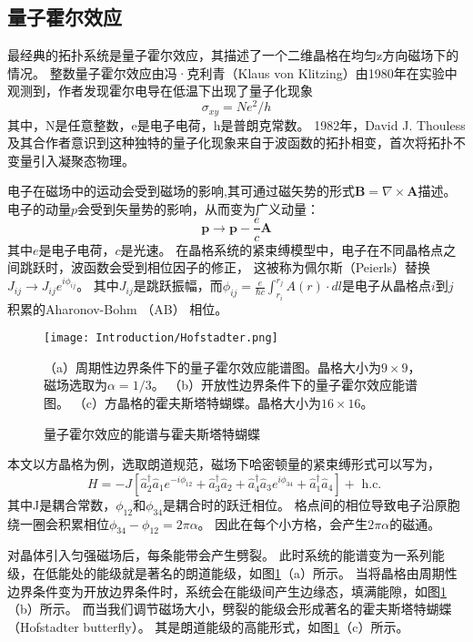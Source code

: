 \subsection{量子霍尔效应}
最经典的拓扑系统是量子霍尔效应，其描述了一个二维晶格在均匀z方向磁场下的情况。
整数量子霍尔效应由冯·克利青（Klaus von Klitzing）由1980年在实验中观测到\cite{klitzing1980new}，作者发现霍尔电导在低温下出现了量子化现象
\begin{equation}
	\sigma_{xy}=Ne^2/h
\end{equation}
其中，N是任意整数，e是电子电荷，h是普朗克常数。
1982年，David J. Thouless及其合作者意识到这种独特的量子化现象来自于波函数的拓扑相变\cite{thouless1982quantized}，首次将拓扑不变量引入凝聚态物理。

电子在磁场中的运动会受到磁场的影响,其可通过磁矢势的形式$\mathbf{B}=\nabla\times \mathbf{A}$描述。
电子的动量$p$会受到矢量势的影响，从而变为广义动量：
\begin{equation}
	\mathbf{p}\to \mathbf{p}-\frac{e}{c}\mathbf{A}
\end{equation}
其中$e$是电子电荷，$c$是光速。
在晶格系统的紧束缚模型中，电子在不同晶格点之间跳跃时，波函数会受到相位因子的修正，
这被称为佩尔斯（Peierls）替换$J_{ij}\to J_{ij}e^{i\phi_{ij}}$。
其中$J_{ij}$是跳跃振幅，而$\phi_{ij}=\frac{e}{\hbar c}\int_{r_i}^{r_j} A(r) \cdot dl$是电子从晶格点$i$到$j$积累的Aharonov-Bohm （AB） 相位。

\begin{figure}[htbp]
	\centering
	\texttt{[image: Introduction/Hofstadter.png]}
 \caption{量子霍尔效应的能谱与霍夫斯塔特蝴蝶}
（a）周期性边界条件下的量子霍尔效应能谱图。晶格大小为$9\times9$，磁场选取为$\alpha=1/3$。
（b）开放性边界条件下的量子霍尔效应能谱图。
（c）方晶格的霍夫斯塔特蝴蝶。晶格大小为$16\times16$。
 \label{fig:Hofstadter}
\end{figure}

本文以方晶格为例，选取朗道规范，磁场下哈密顿量的紧束缚形式可以写为，
\begin{equation}
	H=-J\left[\hat{a}_2^{\dagger} \hat{a}_1 e^{-i \phi_{12}}+\hat{a}_3^{\dagger} \hat{a}_2+\hat{a}_4^{\dagger} \hat{a}_3 e^{i \phi_{34}}+\hat{a}_1^{\dagger} \hat{a}_4\right]+\text { h.c. }
\end{equation}
其中J是耦合常数，$\phi_{12}$和$\phi_{34}$是耦合时的跃迁相位。
格点间的相位导致电子沿原胞绕一圈会积累相位$\phi_{34}-\phi_{12}=2\pi\alpha$。
因此在每个小方格，会产生$2\pi\alpha$的磁通。

对晶体引入匀强磁场后，每条能带会产生劈裂。
此时系统的能谱变为一系列能级，在低能处的能级就是著名的朗道能级，如图\ref{fig:Hofstadter}（a）所示。
当将晶格由周期性边界条件变为开放边界条件时，系统会在能级间产生边缘态，填满能隙，如图\ref{fig:Hofstadter}（b）所示。
而当我们调节磁场大小，劈裂的能级会形成著名的霍夫斯塔特蝴蝶 （Hofstadter butterfly）。
其是朗道能级的高能形式，如图\ref{fig:Hofstadter}（c）所示。

